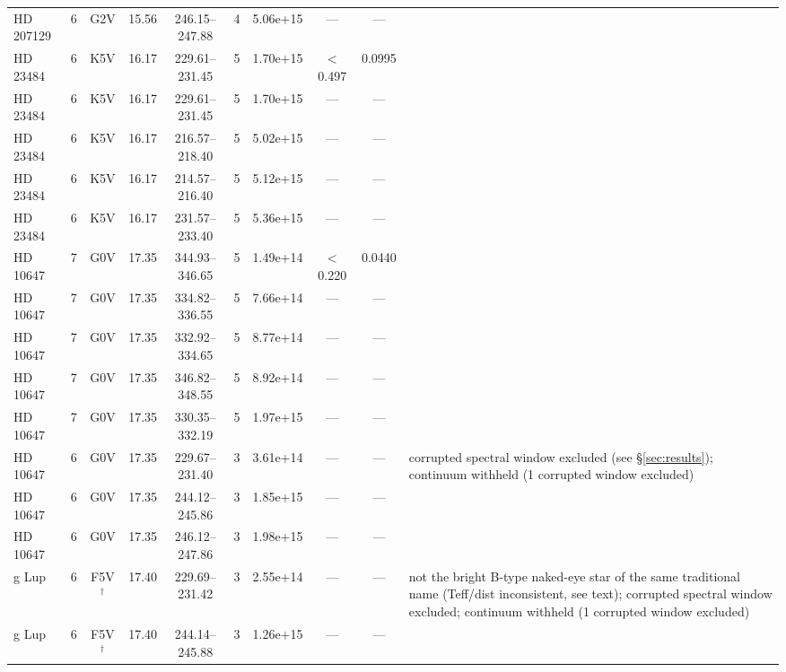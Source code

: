\documentclass{openjournal}
\begin{document}
\begin{table}
\begin{tabularx}{\textwidth}{@{}l c c c c c c c c X@{}}
HD 207129 & 6 & G2V & 15.56 & 246.15--247.88 & 4 & 5.06e+15 & --- & --- &  \\
HD 23484 & 6 & K5V & 16.17 & 229.61--231.45 & 5 & 1.70e+15 & $<$0.497 & 0.0995 &  \\
HD 23484 & 6 & K5V & 16.17 & 229.61--231.45 & 5 & 1.70e+15 & --- & --- &  \\
HD 23484 & 6 & K5V & 16.17 & 216.57--218.40 & 5 & 5.02e+15 & --- & --- &  \\
HD 23484 & 6 & K5V & 16.17 & 214.57--216.40 & 5 & 5.12e+15 & --- & --- &  \\
HD 23484 & 6 & K5V & 16.17 & 231.57--233.40 & 5 & 5.36e+15 & --- & --- &  \\
HD 10647 & 7 & G0V & 17.35 & 344.93--346.65 & 5 & 1.49e+14 & $<$0.220 & 0.0440 &  \\
HD 10647 & 7 & G0V & 17.35 & 334.82--336.55 & 5 & 7.66e+14 & --- & --- &  \\
HD 10647 & 7 & G0V & 17.35 & 332.92--334.65 & 5 & 8.77e+14 & --- & --- &  \\
HD 10647 & 7 & G0V & 17.35 & 346.82--348.55 & 5 & 8.92e+14 & --- & --- &  \\
HD 10647 & 7 & G0V & 17.35 & 330.35--332.19 & 5 & 1.97e+15 & --- & --- &  \\
HD 10647 & 6 & G0V & 17.35 & 229.67--231.40 & 3 & 3.61e+14 & --- & --- & corrupted spectral window excluded (see \S\ref{sec:results}); continuum withheld (1 corrupted window excluded) \\
HD 10647 & 6 & G0V & 17.35 & 244.12--245.86 & 3 & 1.85e+15 & --- & --- &  \\
HD 10647 & 6 & G0V & 17.35 & 246.12--247.86 & 3 & 1.98e+15 & --- & --- &  \\
g Lup & 6 & F5V$^\dagger$ & 17.40 & 229.69--231.42 & 3 & 2.55e+14 & --- & --- & not the bright B-type naked-eye star of the same traditional name (Teff/dist inconsistent, see text); corrupted spectral window excluded; continuum withheld (1 corrupted window excluded) \\
g Lup & 6 & F5V$^\dagger$ & 17.40 & 244.14--245.88 & 3 & 1.26e+15 & --- & --- &  \\
\hline
\end{tabularx}
\end{table}
\end{document}
